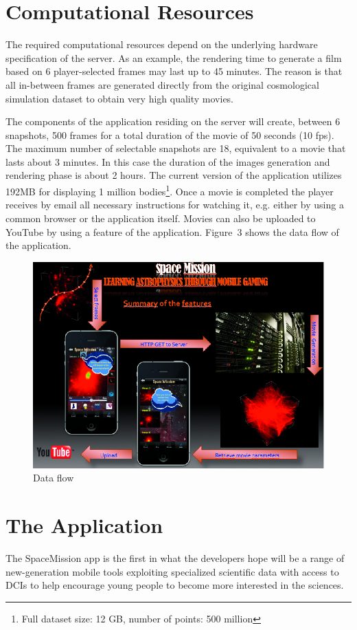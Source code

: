 \section{Computational Resources}
The required computational resources depend on the underlying hardware specification of the server. As an example, the rendering time to generate a film based on 6 player-selected frames may last up to 45 minutes. The reason is that all in-between frames are generated directly from the original cosmological simulation dataset to obtain very high quality movies.

The components of the application residing on the server will  create, between  6 snapshots, 500 frames for a total duration of the movie of 50 seconds  (10 fps). The maximum number of selectable snapshots are 18, equivalent  to a movie that lasts about 3 minutes. In this case the duration of the images generation and rendering phase is about  2 hours. The current version of the application utilizes 192MB for displaying 1 million bodies\footnote{Full dataset size: 12 GB, number of points: 500 million}. Once a movie is completed the player receives by email all necessary instructions for watching it, e.g. either by using a common browser or the application itself. Movies can also be uploaded to YouTube by using a feature of the application. Figure~3 shows the data flow of the application.

\begin{figure}[h]
\centering
\includegraphics[scale=0.9]{part5/Massimino_O24/P024_f3}
\caption{Data flow}
\end{figure}

\section{The Application}
The SpaceMission app is the first in what the developers hope will be a range of new-generation mobile tools exploiting specialized scientific data with access to DCIs to help encourage young people to become more interested in the sciences.

